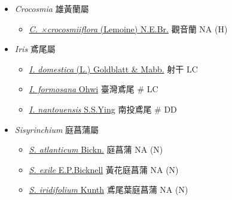 
  \begin{itemize}
 \item[] \textit{Crocosmia} 雄黃蘭屬
                                
  \begin{itemize}
        \item[] \href{http://www.theplantlist.org/tpl1.1/search?q=Crocosmia+×crocosmiiflora}{\textit{C. ×crocosmiiflora} (Lemoine) N.E.Br.}   觀音蘭   NA (H)
  \end{itemize}
 \item[] \textit{Iris} 鳶尾屬
                                
  \begin{itemize}
        \item[] \href{http://www.theplantlist.org/tpl1.1/search?q=Iris+domestica}{\textit{I. domestica} (L.) Goldblatt \& Mabb.}   射干   LC
        \item[] \href{http://www.theplantlist.org/tpl1.1/search?q=Iris+formosana}{\textit{I. formosana} Ohwi}   臺灣鳶尾  \# LC
        \item[] \href{http://www.theplantlist.org/tpl1.1/search?q=Iris+nantouensis}{\textit{I. nantouensis} S.S.Ying}   南投鳶尾  \# DD
  \end{itemize}
 \item[] \textit{Sisyrinchium} 庭菖蒲屬
                                
  \begin{itemize}
        \item[] \href{http://www.theplantlist.org/tpl1.1/search?q=Sisyrinchium+atlanticum}{\textit{S. atlanticum} Bickn.}   庭菖蒲   NA (N)
        \item[] \href{http://www.theplantlist.org/tpl1.1/search?q=Sisyrinchium+exile}{\textit{S. exile} E.P.Bicknell}   黃花庭菖蒲   NA (N)
        \item[] \href{http://www.theplantlist.org/tpl1.1/search?q=Sisyrinchium+iridifolium}{\textit{S. iridifolium} Kunth}   鳶尾葉庭菖蒲   NA (N)
  \end{itemize}
  \end{itemize}
